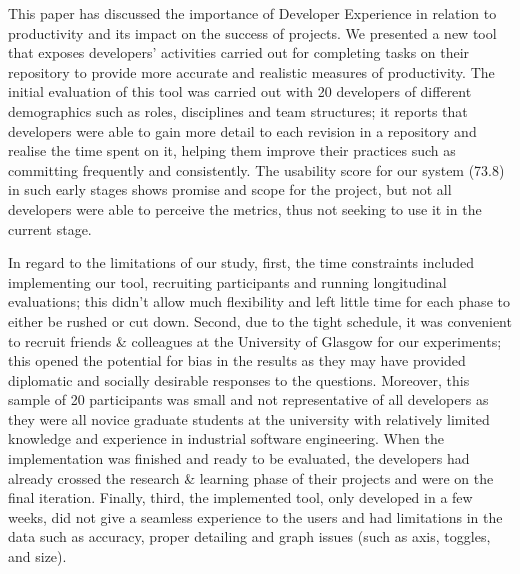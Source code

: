 \documentclass[../mpaper.tex]{subfiles}
\begin{document}
This paper has discussed the importance of Developer Experience in relation to productivity and its impact on the success of projects. We presented a new tool that exposes developers' activities carried out for completing tasks on their repository to provide more accurate and realistic measures of productivity. The initial evaluation of this tool was carried out with 20 developers of different demographics such as roles, disciplines and team structures; it reports that developers were able to gain more detail to each revision in a repository and realise the time spent on it, helping them improve their practices such as committing frequently and consistently. The usability score for our system (73.8) in such early stages shows promise and scope for the project, but not all developers were able to perceive the metrics, thus not seeking to use it in the current stage.

In regard to the limitations of our study, first, the time constraints included implementing our tool, recruiting participants and running longitudinal evaluations; this didn't allow much flexibility and left little time for each phase to either be rushed or cut down. Second, due to the tight schedule, it was convenient to recruit friends \& colleagues at the University of Glasgow for our experiments; this opened the potential for bias in the results as they may have provided diplomatic and socially desirable responses to the questions. Moreover, this sample of 20 participants was small and not representative of all developers as they were all novice graduate students at the university with relatively limited knowledge and experience in industrial software engineering. When the implementation was finished and ready to be evaluated, the developers had already crossed the research \& learning phase of their projects and were on the final iteration. Finally, third, the implemented tool, only developed in a few weeks, did not give a seamless experience to the users and had limitations in the data such as accuracy, proper detailing and graph issues (such as axis, toggles, and size).
\end{document}
